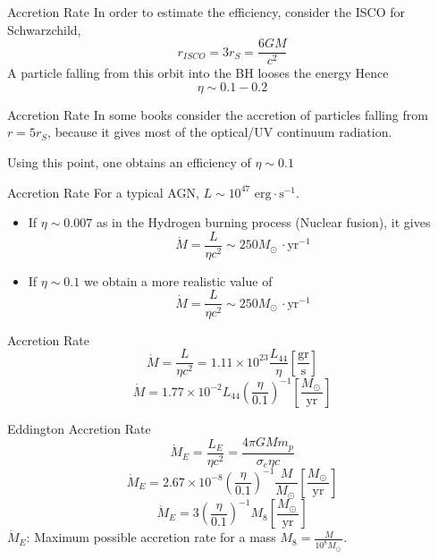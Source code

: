 \documentclass{beamer}
\begin{document}
\begin{frame}{ Accretion Rate}
	In order to estimate the efficiency, consider the ISCO for Schwarzchild, 
	\[r_{ISCO} = 3r_S = \frac{6GM}{c^2}\]
	\pause
	A particle falling from this orbit into the BH  looses the energy
	\pause
	Hence
	\pause
	\[\eta \sim 0.1 - 0.2 \]	
\end{frame}

\begin{frame}{ Accretion Rate}
	In some books consider the accretion of particles falling from $r=5r_S$, because it gives most of the optical/UV continuum radiation.\\
	\pause
	
	Using this point, one obtains an efficiency of $\eta \sim 0.1$
\end{frame}

\begin{frame}{ Accretion Rate}
	For a typical AGN, $L \sim 10^{47} \textrm{ erg} \cdot \textrm{s}^{-1}$.\\
	\pause
	\begin{itemize}
	\item If $\eta \sim 0.007$ as in the Hydrogen burning process (Nuclear fusion), it gives
	\pause
	\[\dot{M} = \frac{L}{\eta c^2} \sim 250 M_{\odot\ } \cdot \textrm{yr}^{-1} \]
	\pause
	\item If $\eta \sim 0.1 $ we obtain a more realistic value of
	\pause
	\[\dot{M} = \frac{L}{\eta c^2} \sim 250 M_{\odot\ } \cdot \textrm{yr}^{-1} \]
	\pause
	\end{itemize}		
\end{frame}

\begin{frame}{ Accretion Rate}
	\[ \dot{M} = \frac{L}{\eta c^2} = 1.11 \times 10^{23} \frac{L_{44}}{\eta} \left[ \frac{\textrm{gr}}{\textrm{s}}\right]\]	
	\pause
	\[ \dot{M} = 1.77 \times 10^{-2} L_{44} \left ( \frac{\eta}{0.1}\right)^{-1} \left[ \frac{M_{\odot\ }}{\textrm{yr}}\right]\]
\end{frame}

\begin{frame}{Eddington Accretion Rate}
	\[ \dot{M}_E = \frac{L_E}{\eta c^2} =  \frac{4 \pi GM m_p}{\sigma_e \eta c} \]	
	\pause
	\[ \dot{M}_E = 2.67 \times 10^{-8} \left ( \frac{\eta}{0.1}\right)^{-1} \frac{M}{M_{\odot\ } }  \left[ \frac{M_{\odot\ }}{\textrm{yr}}\right]\]
	\pause
	\[ \dot{M}_E = 3 \left ( \frac{\eta}{0.1}\right)^{-1} M_8   \left[ \frac{M_{\odot\ }}{\textrm{yr}}\right]\]
	\pause
	$\dot{M}_E$: Maximum possible accretion rate for a mass $M_8 = \frac{M}{10^8 M_{\odot\ }}$.
\end{frame}
\end{document}
